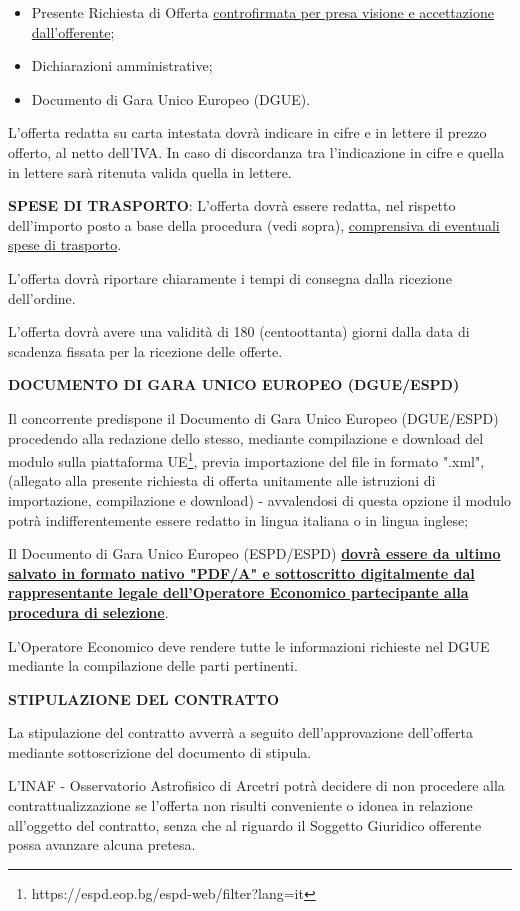 \begin{itemize}
\item Presente Richiesta di Offerta \ul{controfirmata per presa visione e accettazione dall'offerente};
\item Dichiarazioni amministrative;
\item Documento di Gara Unico Europeo (DGUE).
\end{itemize}


L'offerta redatta su carta intestata dovrà indicare in cifre e in lettere il prezzo offerto, al
netto dell'IVA. In caso di discordanza tra l'indicazione in cifre
e quella in lettere sarà ritenuta valida quella in lettere.

\textbf{SPESE DI TRASPORTO}: L'offerta dovrà essere redatta, nel
rispetto dell'importo posto a base della procedura (vedi sopra),
\ul{comprensiva di eventuali spese di trasporto}.

L'offerta dovrà riportare chiaramente i tempi di consegna dalla
ricezione dell'ordine.

L'offerta dovrà avere una validità di 180 (centoottanta) giorni
dalla data di scadenza fissata per la ricezione delle offerte.

\textbf{DOCUMENTO DI GARA UNICO EUROPEO (DGUE/ESPD)}

Il concorrente predispone il Documento di Gara Unico
Europeo (DGUE/ESPD) procedendo alla redazione dello stesso,
mediante compilazione e download del modulo sulla piattaforma
UE\footnote{https://espd.eop.bg/espd-web/filter?lang=it}, previa importazione del
file in formato ".xml", (allegato alla presente richiesta di offerta
unitamente alle istruzioni di importazione, compilazione e download) -
avvalendosi di questa opzione il modulo potrà indifferentemente essere
redatto in lingua italiana o in lingua inglese;

Il Documento di Gara Unico Europeo (ESPD/ESPD) \textbf{\ul{dovr\`a
essere da ultimo salvato in formato nativo "PDF/A" e sottoscritto
digitalmente dal rappresentante legale dell'Operatore Economico
partecipante alla procedura di selezione}}.

L'Operatore Economico deve rendere tutte le informazioni richieste
nel DGUE mediante la compilazione delle parti pertinenti.

\textbf{STIPULAZIONE DEL CONTRATTO}

La stipulazione del contratto avverrà a seguito dell'approvazione
dell'offerta mediante sottoscrizione del documento di stipula.

L'INAF - Osservatorio Astrofisico di Arcetri potrà decidere di non
procedere alla contrattualizzazione se l'offerta non risulti conveniente
o idonea in relazione all'oggetto del contratto, senza che al riguardo
il Soggetto Giuridico offerente possa avanzare alcuna pretesa.

